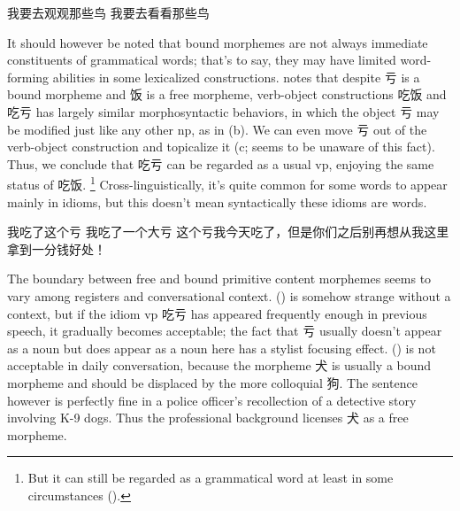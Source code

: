 \documentclass[UTF8, a4paper, oneside, scheme=plain, 12pt]{ctexrep}
\newcommand*{\citesec}[1]{\S~{#1}}
\begin{document}
\begin{exe}
    \ex\label{ex:pos.obsolete-1} \begin{xlist}
        \ex *我要去观观那些鸟
        \ex 我要去看看那些鸟
    \end{xlist}
\end{exe}

It should however be noted that bound morphemes
are not always immediate constituents of grammatical words; 
that's to say, they may have limited word-forming abilities 
in some lexicalized constructions.
\citet[\citesec{8.3.2}]{zhudexigrammar} notes that 
despite 亏 is a bound morpheme and 饭 is a free morpheme,
verb-object constructions 吃饭 and 吃亏 has largely similar morphosyntactic behaviors,
in which the object 亏 may be modified just like any other \acs{np}, 
as in (b).
We can even move 亏 out of the verb-object construction 
and topicalize it (c; 
\citet{zhudexigrammar} seems to be unaware of this fact).
Thus, we conclude that 吃亏 can be regarded 
as a usual \acs{vp},
enjoying the same status of 吃饭.%
\footnote{
    But it can still be regarded as a grammatical word
    at least in some circumstances
    ().
}
Cross-linguistically, 
it's quite common for some words to appear mainly in idioms, 
but this doesn't mean syntactically
these idioms are words.

\begin{exe}
    \ex\label{ex:pos.morpheme.chikui} \begin{xlist}
        \ex 我吃了这个亏
        \ex 我吃了一个大亏
        \ex 这个亏我今天吃了，但是你们之后别再想从我这里拿到一分钱好处！
    \end{xlist}
\end{exe}

The boundary between free and bound primitive content morphemes 
seems to vary among registers and conversational context. 
() is somehow strange without a context, 
but if the idiom \acs{vp} 吃亏 has appeared frequently enough
in previous speech, 
it gradually becomes acceptable;
the fact that 亏 usually doesn't appear as a noun 
but does appear as a noun here 
has a stylist focusing effect.
() is not acceptable in daily conversation,
because the morpheme 犬 is usually a bound morpheme 
and should be displaced by the more colloquial 狗.
The sentence however is perfectly fine in 
a police officer's recollection of a detective story involving K-9 dogs.
Thus the professional background licenses 犬 as a free morpheme.
\end{document}
